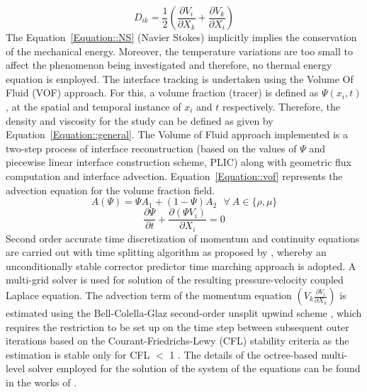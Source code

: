\documentclass[%
aip,
sd,%
amsmath,amssymb,
preprint,%
author-year,%
]{revtex4-1}
\begin{document}
\begin{equation} \label{Equation::deformation}
D_{ik} = \frac{1}{2}\left(\frac{\partial V_i}{\partial X_k} + \frac{\partial V_k}{\partial X_i}\right)
\end{equation}
The Equation~\ref{Equation::NS} (Navier Stokes) implicitly implies the conservation of the mechanical energy. Moreover, the temperature variations are too small to affect the phenomenon being investigated and therefore, no thermal energy equation is employed. The interface tracking is undertaken using the Volume Of Fluid (VOF) approach. For this, a volume fraction (tracer) is defined as $\Psi(x_i,t)$, at the spatial and temporal instance of $x_i$ and $t$ respectively. Therefore, the density and viscosity for the study can be defined as given by Equation~\ref{Equation::general}. The Volume of Fluid approach implemented is a two-step process of interface reconstruction (based on the values of $\Psi$ and piecewise linear interface construction scheme, PLIC) along with geometric flux computation and interface advection. Equation~\ref{Equation::vof} represents the advection equation for the volume fraction field.
\begin{equation} \label{Equation::general}
A (\Psi) = \Psi A_1 + (1-\Psi)A_2 \: \: \:  \forall  \: A \in \{\rho, \mu\}
\end{equation}
\begin{equation} \label{Equation::vof}
\frac{\partial \Psi}{\partial t} + \frac{\partial(\Psi V_i)}{\partial X_i} = 0
\end{equation}
Second order accurate time discretization of momentum and continuity equations are carried out with time splitting algorithm as proposed by \cite{Chorin1968}, whereby an unconditionally stable corrector predictor time marching approach is adopted. A multi-grid solver is used for solution of the resulting pressure-velocity coupled Laplace equation. The advection term of the momentum equation $\left(V_k\frac{\partial V_i}{\partial X_k}\right)$ is estimated using the Bell-Colella-Glaz second-order unsplit upwind scheme \citep{bell1989second}, which requires the restriction to be set up on the time step between subsequent outer iterations based on the Courant-Friedrichs-Lewy (CFL) stability criteria as the estimation is stable only for CFL $<$ 1 \citep{popinet2009}. The details of the octree-based multi-level solver employed for the solution of the system of the equations can be found in the works of \cite{Popinet2003,popinet2009}. \\ 
\end{document}
